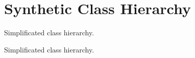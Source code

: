 \hypertarget{group__grpSynthHierarchy}{\section{Synthetic Class Hierarchy}
\label{group__grpSynthHierarchy}
}


Simplificated class hierarchy.  


Simplificated class hierarchy.  